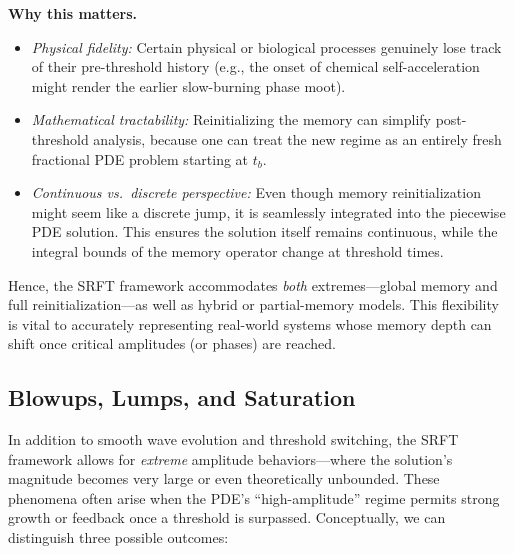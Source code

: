 \documentclass[12pt]{article}
\begin{document}
\medskip

\noindent
\textbf{Why this matters.}
\begin{itemize}
    \item \emph{Physical fidelity:} 
    Certain physical or biological processes genuinely lose track of their
    pre-threshold history (e.g., the onset of chemical self-acceleration might
    render the earlier slow-burning phase moot).
    \item \emph{Mathematical tractability:} 
    Reinitializing the memory can simplify post-threshold analysis, because one
    can treat the new regime as an entirely fresh fractional PDE problem starting
    at $t_b$.
    \item \emph{Continuous vs.\ discrete perspective:} 
    Even though memory reinitialization might seem like a discrete jump, it is
    seamlessly integrated into the piecewise PDE solution. This ensures the
    solution itself remains continuous, while the integral bounds of the memory
    operator change at threshold times.
\end{itemize}

\medskip

\noindent
Hence, the SRFT framework accommodates \emph{both} extremes—global memory and full
reinitialization—as well as hybrid or partial-memory models. This flexibility is
vital to accurately representing real-world systems whose memory depth can shift
once critical amplitudes (or phases) are reached.

\subsection{Blowups, Lumps, and Saturation}
\label{subsec:blowups_lumps_saturation}

In addition to smooth wave evolution and threshold switching, the SRFT framework
allows for \emph{extreme} amplitude behaviors—where the solution’s magnitude
becomes very large or even theoretically unbounded. These phenomena often arise
when the PDE’s “high-amplitude” regime permits strong growth or feedback once a
threshold is surpassed. Conceptually, we can distinguish three possible outcomes:
\end{document}
